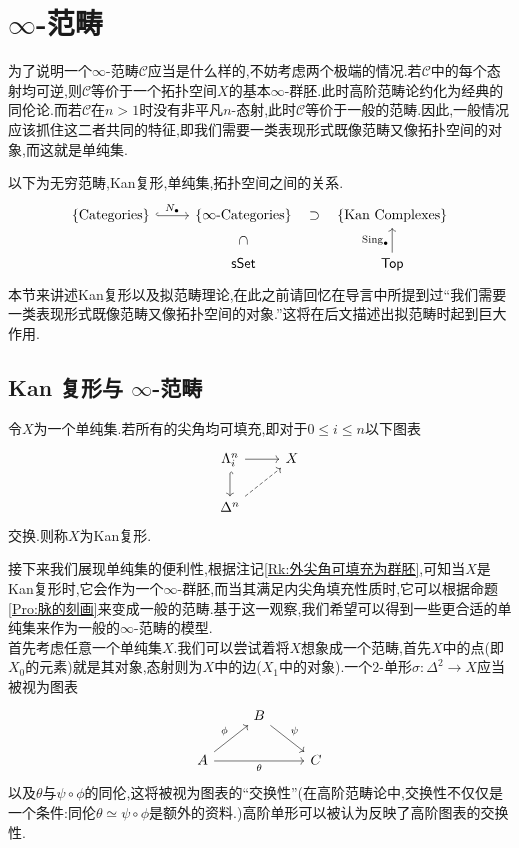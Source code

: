 \chapter{$\infty$-范畴}
为了说明一个$\infty$-范畴$\mathcal{C}$应当是什么样的,不妨考虑两个极端的情况.若$\mathcal{C}$中的每个态射均可逆,则$\mathcal{C}$等价于一个拓扑空间$X$的基本$\infty$-群胚.此时高阶范畴论约化为经典的同伦论.而若$\mathcal{C}$在$n>1$时没有非平凡$n$-态射,此时$\mathcal{C}$等价于一般的范畴.因此,一般情况应该抓住这二者共同的特征,即我们需要一类表现形式既像范畴又像拓扑空间的对象,而这就是单纯集.

以下为无穷范畴,Kan复形,单纯集,拓扑空间之间的关系.
\[\begin{tikzcd}
	{\{\text{Categories}\}} & {\{\infty\text{-Categories}\}} & {\{\text{Kan Complexes}\}} \\
	& {\cate{sSet}} & {\cate{Top}}
	\arrow["{N_{\bullet}}", hook, from=1-1, to=1-2]
	\arrow["\subset"{marking, allow upside down}, draw=none, from=1-2, to=2-2]
	\arrow["\subset"{marking, allow upside down}, draw=none, from=1-3, to=1-2]
	\arrow["{\Sing_{\bullet}}", from=2-3, to=1-3]
\end{tikzcd}\]
本节来讲述Kan复形以及拟范畴理论,在此之前请回忆在导言中所提到过``我们需要一类表现形式既像范畴又像拓扑空间的对象.''这将在后文描述出拟范畴时起到巨大作用.
\section{Kan 复形与 $\infty$-范畴}
\begin{definition}[Kan复形]
    令$X$为一个单纯集.若所有的尖角均可填充,即对于$0\leq i\leq n$以下图表
    \[\begin{tikzcd}
	{\Lambda_i^n} & X \\
	{\Delta^n}
	\arrow[from=1-1, to=1-2]
	\arrow[hook, from=1-1, to=2-1]
	\arrow[dashed, from=2-1, to=1-2]
    \end{tikzcd}\]
    交换.则称$X$为Kan复形.
\end{definition}
接下来我们展现单纯集的便利性,根据注记\ref{Rk:外尖角可填充为群胚},可知当$X$是Kan复形时,它会作为一个$\infty$-群胚,而当其满足内尖角填充性质时,它可以根据命题\ref{Pro:脉的刻画}来变成一般的范畴.基于这一观察,我们希望可以得到一些更合适的单纯集来作为一般的$\infty$-范畴的模型.\\

首先考虑任意一个单纯集$X$.我们可以尝试着将$X$想象成一个范畴,首先$X$中的点(即$X_0$的元素)就是其对象,态射则为$X$中的边($X_1$中的对象).一个$2$-单形$\sigma : \Delta^2 \to X$应当被视为图表
\[\begin{tikzcd}
	& B \\
	A && C
	\arrow["\psi", from=1-2, to=2-3]
	\arrow["\phi", from=2-1, to=1-2]
	\arrow["\theta"', from=2-1, to=2-3]
\end{tikzcd}\]
以及$\theta$与$\psi \circ \phi$的同伦,这将被视为图表的``交换性''(在高阶范畴论中,交换性不仅仅是一个条件:同伦$\theta \simeq \psi \circ \phi$是额外的资料.)高阶单形可以被认为反映了高阶图表的交换性.\\

